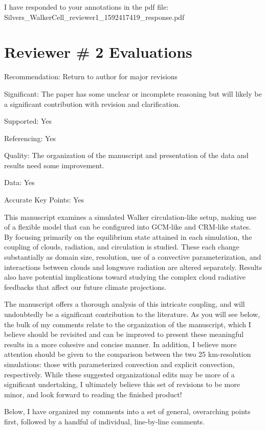 \documentclass[draft]{agujournal2019}
\begin{document}
I have responded to your annotations in the pdf file: 
Silvers\_WalkerCell\_reviewer1\_1592417419\_response.pdf

\section{Reviewer \# 2 Evaluations}

Recommendation: Return to author for major revisions

Significant: The paper has some unclear or incomplete reasoning but will likely be a significant contribution with revision and clarification.

Supported: Yes

Referencing: Yes

Quality: The organization of the manuscript and presentation of the data and results need some improvement.

Data: Yes

Accurate Key Points: Yes

This manuscript examines a simulated Walker circulation-like setup, making use of a flexible model that can be configured into GCM-like and CRM-like states. By focusing primarily on the equilibrium state attained in each simulation, the coupling of clouds, radiation, and circulation is studied. These each change substantially as domain size, resolution, use of a convective parameterization, and interactions between clouds and longwave radiation are altered separately. Results also have potential implications toward studying the complex cloud radiative feedbacks that affect our future climate projections.

The manuscript offers a thorough analysis of this intricate coupling, and will undoubtedly be a significant contribution to the literature. As you will see below, the bulk of my comments relate to the organization of the manuscript, which I believe should be revisited and can be improved to present these meaningful results in a more cohesive and concise manner. In addition, I believe more attention should be given to the comparison between the two 25 km-resolution simulations: those with parameterized convection and explicit convection, respectively. While these suggested organizational edits may be more of a significant undertaking, I ultimately believe this set of revisions to be more minor, and look forward to reading the finished product!

Below, I have organized my comments into a set of general, overarching points first, followed by a handful of individual, line-by-line comments.
\end{document}
